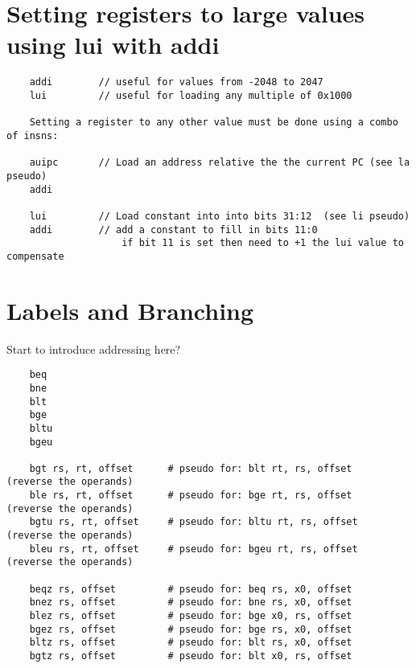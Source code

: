 \section{Setting registers to large values using lui with addi}

\label{uguide:lui}
\label{uguide:auipc}
{\small
\begin{verbatim}
    addi        // useful for values from -2048 to 2047
    lui         // useful for loading any multiple of 0x1000

    Setting a register to any other value must be done using a combo of insns:

    auipc       // Load an address relative the the current PC (see la pseudo)
    addi

    lui         // Load constant into into bits 31:12  (see li pseudo)
    addi        // add a constant to fill in bits 11:0
                    if bit 11 is set then need to +1 the lui value to compensate
\end{verbatim}
}


\section{Labels and Branching}

Start to introduce addressing here?

\label{uguide:beq}
\label{uguide:bne}
\label{uguide:blt}
\label{uguide:bge}
\label{uguide:bltu}
\label{uguide:bgeu}
\label{uguide:bgt}
\label{uguide:ble}
\label{uguide:bgtu}
\label{uguide:beqz}
\label{uguide:bnez}
\label{uguide:blez}
\label{uguide:bgez}
\label{uguide:bltz}
\label{uguide:bgtz}
{\small
\begin{verbatim}
    beq
    bne
    blt
    bge
    bltu
    bgeu

    bgt rs, rt, offset      # pseudo for: blt rt, rs, offset    (reverse the operands)
    ble rs, rt, offset      # pseudo for: bge rt, rs, offset    (reverse the operands)
    bgtu rs, rt, offset     # pseudo for: bltu rt, rs, offset   (reverse the operands)
    bleu rs, rt, offset     # pseudo for: bgeu rt, rs, offset   (reverse the operands)

    beqz rs, offset         # pseudo for: beq rs, x0, offset
    bnez rs, offset         # pseudo for: bne rs, x0, offset
    blez rs, offset         # pseudo for: bge x0, rs, offset
    bgez rs, offset         # pseudo for: bge rs, x0, offset
    bltz rs, offset         # pseudo for: blt rs, x0, offset
    bgtz rs, offset         # pseudo for: blt x0, rs, offset
\end{verbatim}
}



